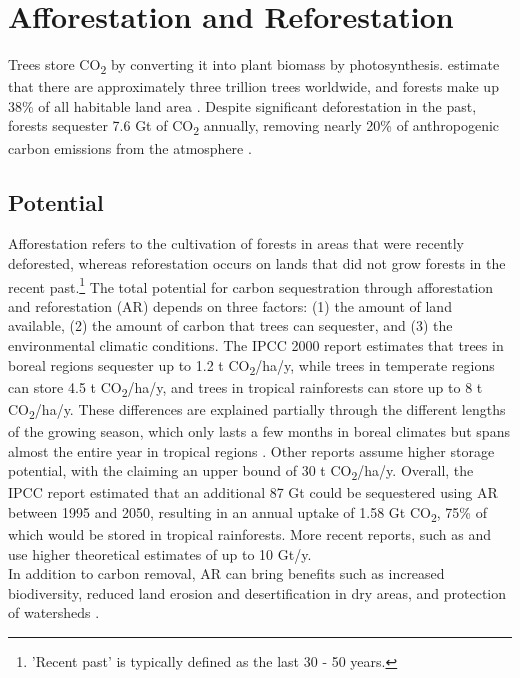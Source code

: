 \section{Afforestation and Reforestation}
Trees store CO\textsubscript{2} by converting it into plant biomass by photosynthesis. \textcite{Crowther2015MappingScale} estimate that there are approximately three trillion trees worldwide, and forests make up 38\% of all habitable land area \parencite{RitchieHowForested}. Despite significant deforestation in the past, forests sequester 7.6 Gt of CO\textsubscript{2} annually, removing nearly 20\% of anthropogenic carbon emissions from the atmosphere \parencite{Harris2021GlobalFluxes}.
\subsection*{Potential}
Afforestation refers to the cultivation of forests in areas that were recently deforested, whereas reforestation occurs on lands that did not grow forests in the recent past.\footnote{'Recent past' is typically defined as the last 30 - 50 years.} The total potential for carbon sequestration through afforestation and reforestation (AR) depends on three factors: (1) the amount of land available, (2) the amount of carbon that trees can sequester, and (3) the environmental climatic conditions.
The IPCC 2000 report estimates that trees in boreal regions sequester up to 1.2 t CO\textsubscript{2}/ha/y, while trees in temperate regions can store 4.5 t CO\textsubscript{2}/ha/y, and trees in tropical rainforests can store up to 8 t CO\textsubscript{2}/ha/y. These differences are explained partially through the different lengths of the growing season, which only lasts a few months in boreal climates but spans almost the entire year in tropical regions \parencite[172-173]{Watson2000LandForestry}. Other reports assume higher storage potential, with the \textcite{NAS2018NegativeAgenda} claiming an upper bound of 30 t CO\textsubscript{2}/ha/y. Overall, the IPCC report estimated that an additional 87 Gt could be sequestered using AR between 1995 and 2050, resulting in an annual uptake of 1.58 Gt CO\textsubscript{2}, 75\% of which would be stored in tropical rainforests. More recent reports, such as \textcite{Fuss2018NegativeEffects} and \textcite{Griscom2017NaturalSolutions} use higher theoretical estimates of up to 10 Gt/y.\\
In addition to carbon removal, AR can bring benefits such as increased biodiversity, reduced land erosion and desertification in dry areas, and protection of watersheds \parencite[177]{Watson2000LandForestry}.
